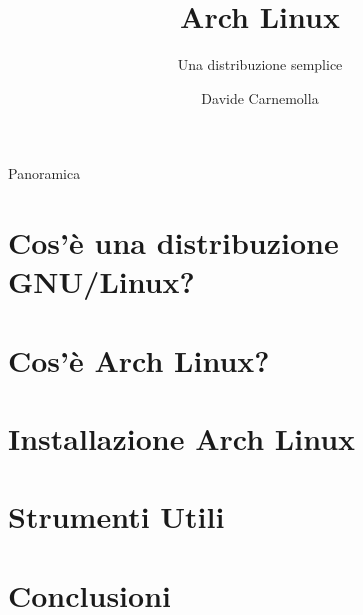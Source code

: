 \documentclass[aspectratio=43,xcolor=dvipsnames]{beamer}
\title{Arch Linux}
\subtitle{Una distribuzione semplice}
\author {Davide Carnemolla}
\institute %
{
    Dipartimento di Matematica e Informatica \\
    Università degli Studi di Catania
    \vskip 100pt
    Saturday Morning Snippets 2021
}
\date{}
\begin{document}
\begin{frame}
    \titlepage
\end{frame}

\begin{frame}{Panoramica}
    \tableofcontents
\end{frame}

\section{Cos'è una distribuzione GNU/Linux?}


\section{Cos'è Arch Linux?}


\section{Installazione Arch Linux}


\section{Strumenti Utili}


\section{Conclusioni}




\end{document}
